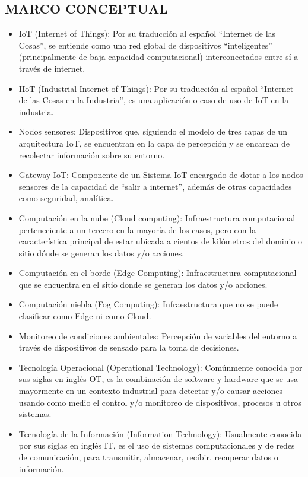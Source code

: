 \documentclass[stu,12pt,floatsintext]{apa7}
\begin{document}
	\subsection{MARCO CONCEPTUAL}
		\begin{itemize}
		\item IoT (Internet of Things): Por su traducción al español ``Internet de las Cosas'', se entiende como una red global de dispositivos ``inteligentes'' (principalmente de baja capacidad computacional) interconectados entre sí a través de internet.
		\item IIoT (Industrial Internet of Things): Por su traducción al español ``Internet de las Cosas en la Industria'', es una aplicación o caso de uso de IoT en la industria.
		\item Nodos sensores: Dispositivos que, siguiendo el modelo de tres capas de un arquitectura IoT, se encuentran en la capa de percepción y se encargan de recolectar información sobre su entorno.
		\item Gateway IoT: Componente de un Sistema IoT encargado de dotar a los nodos sensores de la capacidad de ``salir a internet'', además de otras capacidades como seguridad, analítica.
		\item Computación en la nube (Cloud computing): Infraestructura computacional perteneciente a un tercero en la mayoría de los casos, pero con la característica principal de estar ubicada a cientos de kilómetros del dominio o sitio dónde se generan los datos y/o acciones.
		\item Computación en el borde (Edge Computing): Infraestructura computacional que se encuentra en el sitio donde se generan los datos y/o acciones.
		\item Computación niebla (Fog Computing): Infraestructura que no se puede clasificar como Edge ni como Cloud.
		\item Monitoreo de condiciones ambientales: Percepción de variables del entorno a través de dispositivos de sensado para la toma de decisiones.
		\item Tecnología Operacional (Operational Technology): Comúnmente conocida por sus siglas en inglés OT, es la combinación de software y hardware que se usa mayormente en un contexto industrial para detectar y/o causar acciones usando como medio el control y/o monitoreo de dispositivos, procesos u otros sistemas.
		\item Tecnología de la Información (Information Technology):  Usualmente conocida por sus siglas en inglés IT, es el uso de sistemas computacionales y de redes de comunicación, para transmitir, almacenar, recibir, recuperar datos o información.

\end{itemize}
\end{document}
